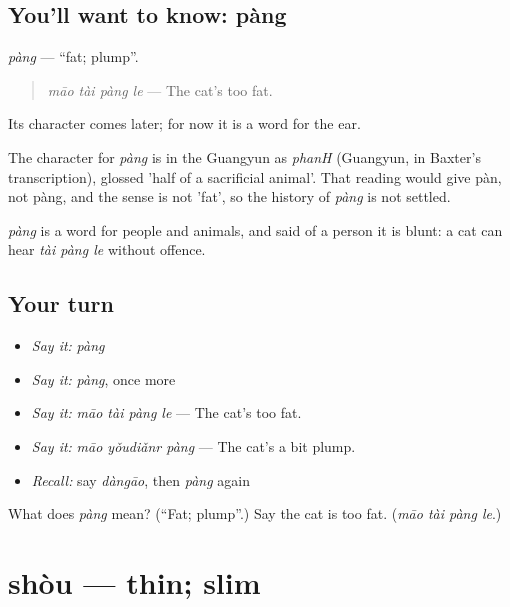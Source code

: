 \subsection*{You'll want to know: pàng}
\emph{pàng} — \textquotedblleft{}fat; plump\textquotedblright{}.

\begin{quote}
\emph{māo tài pàng le} — The cat's too fat.
\end{quote}

Its character comes later; for now it is a word for the ear.

\begin{cousinweb}
The character for \emph{pàng} is in the Guangyun as \emph{phanH} (Guangyun, in Baxter's transcription), glossed 'half of a sacrificial animal'. That reading would give pàn, not pàng, and the sense is not 'fat', so the history of \emph{pàng} is not settled.
\end{cousinweb}

\begin{grammarlens}[title={What you've built}]
\emph{pàng} is a word for people and animals, and said of a person it is blunt: a cat can hear \emph{tài pàng le} without offence.
\end{grammarlens}

\subsection*{Your turn}
\begin{itemize}
\raggedright
  \item \emph{Say it:} \emph{pàng}
  \item \emph{Say it:} \emph{pàng}, once more
  \item \emph{Say it:} \emph{māo tài pàng le} — The cat's too fat.
  \item \emph{Say it:} \emph{māo yǒudiǎnr pàng} — The cat's a bit plump.
  \item \emph{Recall:} say \emph{dàngāo}, then \emph{pàng} again
\end{itemize}

\begin{tcolorbox}[breakable,colback=teal!4,colframe=teal!35!black,title={Before you move on}]
What does \emph{pàng} mean? (\textquotedblleft{}Fat; plump\textquotedblright{}.) Say the cat is too fat. (\emph{māo tài pàng le}.)
\end{tcolorbox}
\section[shòu]{shòu — thin; slim}


